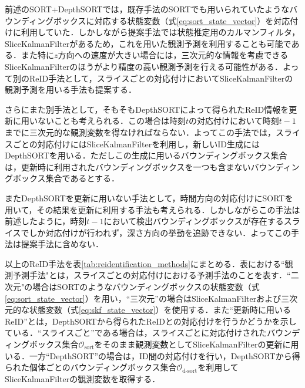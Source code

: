         前述のSORT+DepthSORTでは，既存手法のSORTでも用いられていたようなバウンディングボックスに対応する状態変数（式\ref{eq:sort_state_vector}）を対応付けに利用していた．しかしながら提案手法では状態推定用のカルマンフィルタ，SliceKalmanFilterがあるため，これを用いた観測予測を利用することも可能である．また特に$z$方向への速度が大きい場合には，三次元的な情報を考慮できるSliceKalmanFilterのほうがより精度の高い観測予測を行える可能性がある．よって別のReID手法として，スライスごとの対応付けにおいてSliceKalmanFilterの観測予測を用いる手法も提案する．
        
        さらにまた別手法として，そもそもDepthSORTによって得られたReID情報を更新に用いないことも考えられる．この場合は時刻$t$の対応付けにおいて時刻$t-1$までに三次元的な観測変数を得なければならない．よってこの手法では，スライスごとの対応付けにはSliceKalmanFilterを利用し，新しいID生成にはDepthSORTを用いる．ただしこの生成に用いるバウンディングボックス集合は，更新時に利用されたバウンディングボックスを一つも含まないバウンディングボックス集合であるとする．

        またDepthSORTを更新に用いない手法として，時間方向の対応付けにSORTを用いて，その結果を更新に利用する手法も考えられる．しかしながらこの手法は前述したように，時刻$t-1$において検出バウンディングボックスが存在するスライスでしか対応付けが行われず，深さ方向の挙動を追跡できない．よってこの手法は提案手法に含めない．

        以上のReID手法を表\ref{tab:reidentification_methods}にまとめる．表における``観測予測手法"とは，スライスごとの対応付けにおける予測手法のことを表す．``二次元"の場合はSORTのようなバウンディングボックスの状態変数（式\ref{eq:sort_state_vector}）を用い，``三次元''の場合はSliceKalmanFilterおよび三次元的な状態変数（式\ref{eq:skf_state_vector}）を使用する．また``更新時に用いるReID''とは，DepthSORTから得られたReIDとの対応付けを行うかどうかを示している．``スライスごと''である場合は，スライスごとに対応付けされたバウンディングボックス集合$\mathcal{O}_{\text{sort}}$をそのまま観測変数としてSliceKalmanFilterの更新に用いる．一方``DepthSORT''の場合は，ID間の対応付けを行い，DepthSORTから得られた個体ごとのバウンディングボックス集合$\mathcal{O}_{\text{d-sort}}$を利用してSliceKalmanFilterの観測変数を取得する．